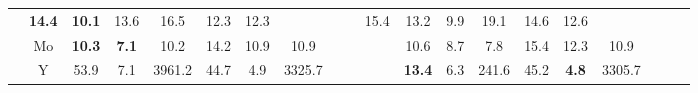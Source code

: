 \documentclass[french,10pt]{article}
\begin{document}
\begin{landscape}
\begin{longtable}{ l  c | c c c | c c c | c c c | c c c | c c c | c c c | }
                    &                     \textbf{ 14.4}
     & {\footnotesize     \textbf{ 10.1}
    } & {\footnotesize     13.6
     }
    
    
                    &                     16.5
     & {\footnotesize     12.3
    } & {\footnotesize     12.3
     }
    
    
                    & & &

                    &                     15.4
     & {\footnotesize     13.2
    } & {\footnotesize     9.9
     }
    
    
                    &                     19.1
     & {\footnotesize     14.6
    } & {\footnotesize     12.6
     }
    
    
                    & & &

                    \\*
                        & {\small Mo  }

                    &                     \textbf{ 10.3}
     & {\footnotesize     \textbf{ 7.1}
    } & {\footnotesize     10.2
     }
    
    
                    &                     14.2
     & {\footnotesize     10.9
    } & {\footnotesize     10.9
     }
    
    
                    & & &

                    &                     10.6
     & {\footnotesize     8.7
    } & {\footnotesize     7.8
     }
    
    
                    &                     15.4
     & {\footnotesize     12.3
    } & {\footnotesize     10.9
     }
    
    
                    & & &

                    \\*
                        & {\small Y  }

                    &                     53.9
     & {\footnotesize     7.1
    } & {\footnotesize     3961.2
     }
    
    
                    &                     44.7
     & {\footnotesize     4.9
    } & {\footnotesize     3325.7
     }
    
    
                    & & &

                    &                     \textbf{ 13.4}
     & {\footnotesize     6.3
    } & {\footnotesize     241.6
     }
    
    
                    &                     45.2
     & {\footnotesize     \textbf{ 4.8}
    } & {\footnotesize     3305.7
     }
    

\end{longtable}
\end{landscape}
\end{document}
